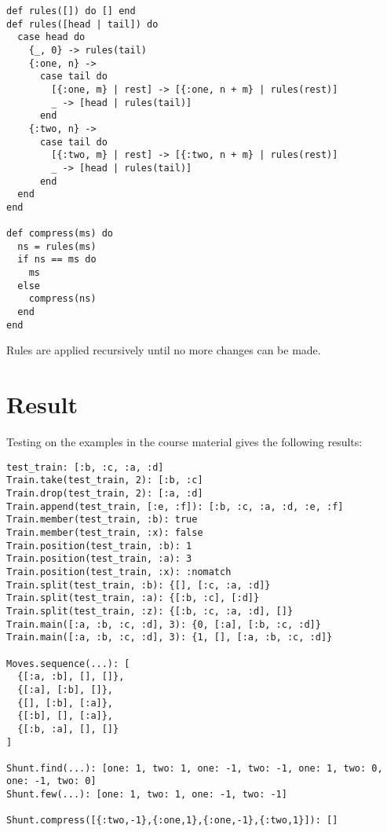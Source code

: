 \documentclass[a4paper,11pt]{article}
\begin{document}
\begin{verbatim}
def rules([]) do [] end
def rules([head | tail]) do
  case head do
    {_, 0} -> rules(tail)
    {:one, n} ->
      case tail do
        [{:one, m} | rest] -> [{:one, n + m} | rules(rest)]
        _ -> [head | rules(tail)]
      end
    {:two, n} ->
      case tail do
        [{:two, m} | rest] -> [{:two, n + m} | rules(rest)]
        _ -> [head | rules(tail)]
      end
  end
end

def compress(ms) do
  ns = rules(ms)
  if ns == ms do
    ms
  else
    compress(ns)
  end
end
\end{verbatim}

Rules are applied recursively until no more changes can be made.

\section*{Result}

Testing on the examples in the course material gives the following results:

\begin{verbatim}
test_train: [:b, :c, :a, :d]
Train.take(test_train, 2): [:b, :c]
Train.drop(test_train, 2): [:a, :d]
Train.append(test_train, [:e, :f]): [:b, :c, :a, :d, :e, :f]
Train.member(test_train, :b): true
Train.member(test_train, :x): false
Train.position(test_train, :b): 1
Train.position(test_train, :a): 3
Train.position(test_train, :x): :nomatch
Train.split(test_train, :b): {[], [:c, :a, :d]}
Train.split(test_train, :a): {[:b, :c], [:d]}
Train.split(test_train, :z): {[:b, :c, :a, :d], []}
Train.main([:a, :b, :c, :d], 3): {0, [:a], [:b, :c, :d]}
Train.main([:a, :b, :c, :d], 3): {1, [], [:a, :b, :c, :d]}

Moves.sequence(...): [
  {[:a, :b], [], []},
  {[:a], [:b], []},
  {[], [:b], [:a]},
  {[:b], [], [:a]},
  {[:b, :a], [], []}
]

Shunt.find(...): [one: 1, two: 1, one: -1, two: -1, one: 1, two: 0, one: -1, two: 0]
Shunt.few(...): [one: 1, two: 1, one: -1, two: -1]

Shunt.compress([{:two,-1},{:one,1},{:one,-1},{:two,1}]): []
\end{verbatim}
\end{document}
